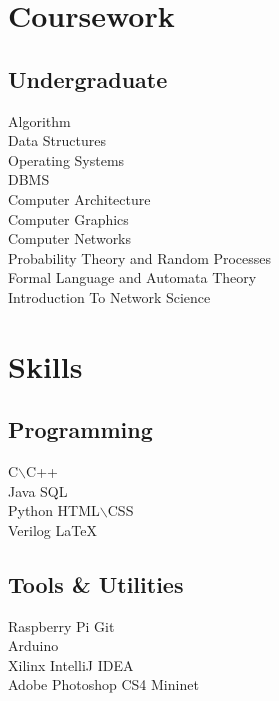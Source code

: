 \documentclass[]{single-page-resume}
\begin{document}
\begin{minipage}[t]{0.33\textwidth}

\section{Coursework}

\subsection{Undergraduate}
Algorithm \\
Data Structures \\
Operating Systems \\
DBMS \\
Computer Architecture \\
Computer Graphics  \\
Computer Networks \\
Probability Theory and Random Processes  \\
Formal Language and Automata Theory \\
Introduction To Network Science
\sectionsep


\section{Skills}
\subsection{Programming}
C$\backslash$C++  \\
Java \textbullet{} SQL \\  
\textbullet{} Python
\textbullet{} HTML$\backslash$CSS \\ \textbullet{} Verilog 
\textbullet{} \LaTeX\ \\
\sectionsep
\subsection{Tools \& Utilities}
\textbullet{} Raspberry Pi\textbullet{} Git \\
 \textbullet{} Arduino \\ 
\textbullet{} Xilinx \textbullet{}  IntelliJ IDEA \\ \textbullet{} Adobe Photoshop CS4  \textbullet{} Mininet

\sectionsep

%
%

\end{minipage} 
\end{document}
